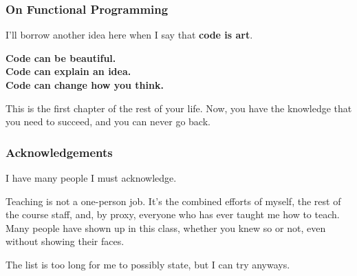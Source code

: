 \documentclass[aspectratio=169, handout]{beamer}
\begin{document}
\begin{frame}[fragile]
  \frametitle{On Functional Programming}

  I'll borrow another idea here when I say that \textbf{code is art}.

  \pause
  \vspace{\fill}

  \begin{center}
    {\large
    \textbf{Code can be beautiful.} \pause \\
    \vspace{10pt}
    \textbf{Code can explain an idea.} \pause \\
    \vspace{10pt}
    \textbf{Code can change how you think.}
    }
  \end{center}

  \pause
  \vspace{\fill}

  This is the first chapter of the rest of your life. Now, you have the knowledge
  that you need to succeed, and you can never go back.
\end{frame}

\begin{comment}
    themes:
    Something Worth Teaching
    Be Pessimistic
    Be Clever by Being Dumb
    Self-Defense Against Yourself
    we are in the business of writing correct codes

    a cautionary tale against tribalism

    code can be beautiful, code can express an idea, code is art
  i will not forget one second of this, when the doctor was me

    planned out rant that I have memorized and use the clicker to display behind
    me while I say it

    I never got to go to my graduation, so I never got a proper send-off. Well,
    this is it.
\end{comment}


\begin{frame}[fragile]
  \frametitle{Acknowledgements}

  I have many people I must acknowledge.

  \pause
  \vspace{\fill}

  Teaching is not a one-person job. It's the combined efforts of myself, the
  rest of the course staff, and, by proxy, everyone who has ever taught me
  how to teach. Many people have shown up in this class, whether you knew so
  or not, even without showing their faces.

  \pause
  \vspace{\fill}

  The list is too long for me to possibly state, but I can try anyways.
\end{frame}
\end{document}
